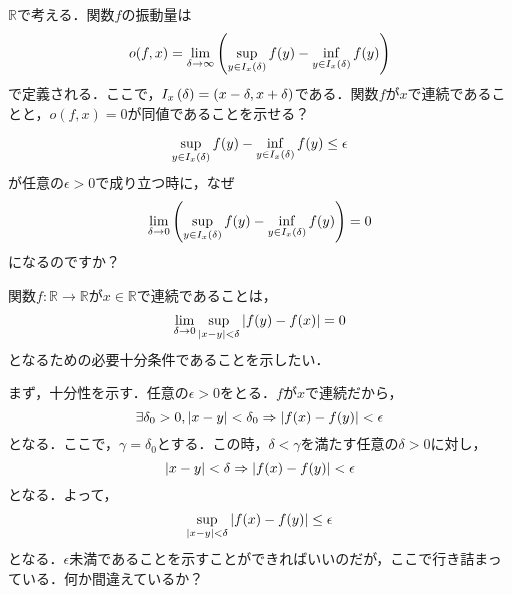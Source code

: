 \documentclass[12pt]{jarticle}
\numberwithin{equation}{section}    %
\numberwithin{figure}{section}      %
\numberwithin{table}{section}      %
\begin{document}
$\mathbb{R}$で考える．関数$f$の振動量は
\begin{equation}
    o(f, x) = \lim_{\delta \to \infty} \left(\sup_{y \in I_{x}\left(\delta\right)} f(y) - \inf_{y \in I_{x}\left(\delta\right)} f(y)\right)
\end{equation}
で定義される．ここで，$I_{x}\left(\delta\right) = \left(x - \delta, x + \delta\right)$である．関数$f$が$x$で連続であることと，$o(f, x) = 0$が同値であることを示せる？

\begin{equation}
    \sup_{y \in I_{x}\left(\delta\right)} f(y) - \inf_{y \in I_{x}\left(\delta\right)} f(y) \le \epsilon
\end{equation}
が任意の$\epsilon > 0$で成り立つ時に，なぜ
\begin{equation}
    \lim_{\delta \to 0} \left(\sup_{y \in I_{x}\left(\delta\right)} f(y) - \inf_{y \in I_{x}\left(\delta\right)} f(y)\right) = 0
\end{equation}
になるのですか？

関数$f: \mathbb{R} \to \mathbb{R}$が$x \in \mathbb{R}$で連続であることは，
\begin{equation}
    \lim_{\delta \to 0} \sup_{\left|x - y\right| < \delta} \left|f(y) - f(x)\right| = 0
\end{equation}
となるための必要十分条件であることを示したい．

まず，十分性を示す．任意の$\epsilon > 0$をとる．$f$が$x$で連続だから，
\begin{equation}
    \exists \delta_{0} > 0, \left|x - y\right| < \delta_{0} \Rightarrow \left|f(x) - f(y)\right| < \epsilon
\end{equation}
となる．ここで，$\gamma = \delta_{0}$とする．この時，$\delta < \gamma$を満たす任意の$\delta > 0$に対し，
\begin{equation}
    \left|x - y\right| < \delta \Rightarrow \left|f(x) - f(y)\right| < \epsilon
\end{equation}
となる．よって，
\begin{equation}
    \sup_{\left|x - y\right| < \delta} \left|f(x) - f(y)\right| \le \epsilon
\end{equation}
となる．$\epsilon$未満であることを示すことができればいいのだが，ここで行き詰まっている．何か間違えているか？
\end{document}
